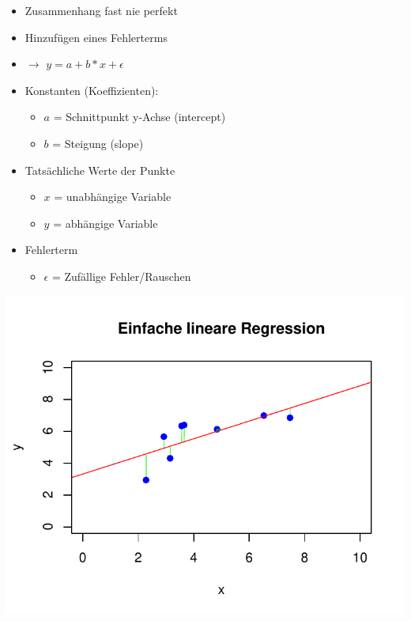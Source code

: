 \documentclass[aspectratio=169, journal, x11names, unknownkeysallowed, hyperref={colorlinks,
linkcolor = SS2,
urlcolor  = F3,
citecolor = F3,
anchorcolor = A4}, 12pt]{beamer}
\newcommand{\oarrow}{\textcolor{A1}{$\rightarrow$} }
\begin{document}
\begin{frame}[t]
  \begin{minipage}[t]{0.45\textwidth}
    \vspace{-11.5em}
    \begin{itemize}
      \item Zusammenhang fast nie perfekt
      \item Hinzufügen eines Fehlerterms
      \item[] \oarrow $y = a + b * x + \epsilon$
      \item Konstanten (Koeffizienten):  
      \begin{itemize}
        \item $a$ = Schnittpunkt y-Achse (intercept)
        \item $b$ = Steigung (slope) 
      \end{itemize}
      \item Tatsächliche Werte der Punkte
      \begin{itemize}
        \item $x$ = unabhängige Variable
        \item $y$ = abhängige Variable
      \end{itemize} 
      \item Fehlerterm
      \begin{itemize}
        \item $\epsilon$ = Zufällige Fehler/Rauschen
      \end{itemize} 
    \end{itemize}
\end{minipage}%
\begin{minipage}[t]{0.45\textwidth}
  \centering
  \includegraphics[scale=0.5]{../Plots/reg_lin_4.pdf}
\end{minipage}
\end{frame}
\end{document}
